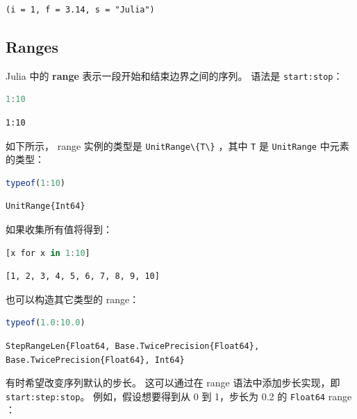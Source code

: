 \documentclass[
  notoc %
]{tufte-book}
\newcommand{\passthrough}[1]{#1}
\begin{document}
\begin{lstlisting}[language=Output]
(i = 1, f = 3.14, s = "Julia")
\end{lstlisting}

\hypertarget{sec:ranges}{%
\subsection{Ranges}\label{sec:ranges}}

Julia 中的 \textbf{range} 表示一段开始和结束边界之间的序列。 语法是
\passthrough{\lstinline!start:stop!}：

\begin{lstlisting}[language=Julia]
1:10
\end{lstlisting}

\begin{lstlisting}[language=Output]
1:10
\end{lstlisting}

如下所示， range 实例的类型是 \passthrough{\lstinline!UnitRange\{T\}!}
，其中 \passthrough{\lstinline!T!} 是
\passthrough{\lstinline!UnitRange!} 中元素的类型：

\begin{lstlisting}[language=Julia]
typeof(1:10)
\end{lstlisting}

\begin{lstlisting}[language=Output]
UnitRange{Int64}
\end{lstlisting}

如果收集所有值将得到：

\begin{lstlisting}[language=Julia]
[x for x in 1:10]
\end{lstlisting}

\begin{lstlisting}[language=Output]
[1, 2, 3, 4, 5, 6, 7, 8, 9, 10]
\end{lstlisting}

也可以构造其它类型的 range：

\begin{lstlisting}[language=Julia]
typeof(1.0:10.0)
\end{lstlisting}

\begin{lstlisting}[language=Output]
StepRangeLen{Float64, Base.TwicePrecision{Float64}, Base.TwicePrecision{Float64}, Int64}
\end{lstlisting}

有时希望改变序列默认的步长。 这可以通过在 range 语法中添加步长实现，即
\passthrough{\lstinline!start:step:stop!}。 例如，假设想要得到从 0 到
1，步长为 0.2 的 \passthrough{\lstinline!Float64!} range ：
\end{document}
